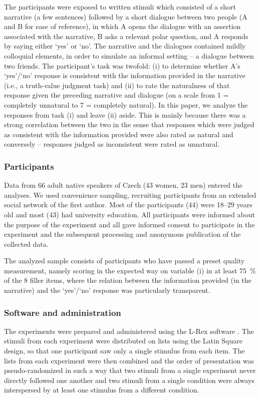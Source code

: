 \documentclass[output=paper,colorlinks,citecolor=brown]{langscibook}
\begin{document}
The participants were exposed to written stimuli which consisted of a short narrative (a few sentences) followed by a short dialogue between two people (A and B for ease of reference), in which A opens the dialogue with an assertion associated with the narrative, B asks a relevant polar question, and A responds by saying either `yes' or `no'. The narrative and the dialogues contained mildly colloquial elements, in order to simulate an informal setting -- a dialogue between two friends. The participant's task was twofold: (i) to determine whether A's `yes'/`no' response is consistent with the information provided in the narrative (i.e., a truth-value judgment task) and (ii) to rate the naturalness of that response given the preceding narrative and dialogue (on a scale from 1 = completely unnatural to 7 = completely natural). In this paper, we analyze the responses from task (i) and leave (ii) aside. This is mainly because there was a strong correlation between the two in the sense that responses which were judged as consistent with the information provided were also rated as natural and conversely -- responses judged as inconsistent were rated as unnatural.

\subsubsection{Participants}

Data from 66 adult native speakers of Czech (43 women, 23 men) entered the analyses. We used convenience sampling, recruiting participants from an extended social network of the first author. Most of the participants (44) were 18--29 years old and most (43) had university education. All participants were informed about the purpose of the experiment and all gave informed consent to participate in the experiment and the subsequent processing and anonymous publication of the collected data.

The analyzed sample consists of participants who have passed a preset quality measurement, namely scoring in the expected way on variable (i) in at least \qty{75}{\percent} of the 8 filler items, where the relation between the information provided (in the narrative) and the `yes'/`no' response was particularly transparent.

\subsubsection{Software and administration}

The experiments were prepared and administered using the L-Rex software \citep{strachenko23}. The stimuli from each experiment were distributed on lists using the Latin Square design, so that one participant saw only a single stimulus from each item. The lists from each experiment were then combined and the order of presentation was pseudo-randomized in such a way that two stimuli from a single experiment never directly followed one another and two stimuli from a single condition were always interspersed by at least one stimulus from a different condition.
\end{document}
